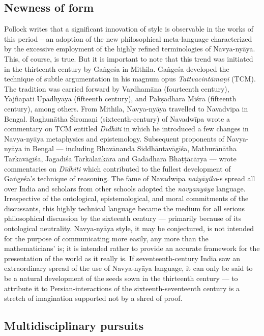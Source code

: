 \subsection{Newness of form}%

Pollock writes that a significant innovation of style is observable in the works of this period – an adoption of the new philosophical meta-language characterized by the excessive employment of the highly refined terminologies of Navya-nyāya. This, of course, is true. But it is important to note that this trend was initiated in the thirteenth century by Gaṅgeśa in Mithila. Gaṅgeśa developed the technique of subtle argumentation in his magnum opus {\sl Tattvacintāmaṇi} (TCM). The tradition was carried forward by Vardhamāna (fourteenth century), Yajñapati Upādhyāya (fifteenth century), and Pakṣadhara Miśra (fifteenth century), among others. From Mithila, Navya-nyāya travelled to Navadvīpa in Bengal. Raghunātha Śiromaṇi (sixteenth-century) of Navadwīpa wrote a commentary on TCM entitled {\sl Dīdhiti} in which he introduced a few changes in Navya-nyāya metaphysics and epistemology. Subsequent proponents of Navya-nyāya in Bengal — including Bhavānanda Siddhāntavāgīśa, Mathurānātha Tarkavāgīśa, Jagadīśa Tarkālaṅkāra and Gadādhara Bhaṭṭācārya — wrote commentaries on {\sl Dīdhiti} which contributed to the fullest development of Gaṅgeśa’s technique of reasoning. The fame of Navadwīpa {\sl naiyāyika}-s spread all over India and scholars from other schools adopted the {\sl navyanyāya} language.  Irrespective of the ontological, epistemological, and moral commitments of the discussants, this highly technical language became the medium for all serious philosophical discussion by the sixteenth century — primarily because of its ontological neutrality. Navya-nyāya style, it may be conjectured, is not intended for the purpose of communicating more easily,
any more than the mathematicians’ is; it is intended rather to provide an accurate framework for the presentation of the world as it really is. If seventeenth-century India saw an extraordinary spread of the use of Navya-nyāya language, it can only be said to be a natural development of the seeds sown in the thirteenth century — to attribute it to Persian-interactions of the sixteenth-seventeenth century is a stretch of imagination supported not by a shred of proof. 

\subsection{Multidisciplinary pursuits}%

